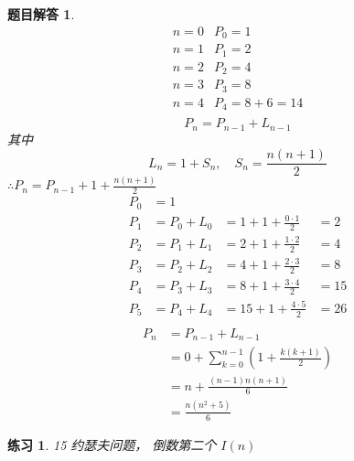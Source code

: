 \documentclass[mode=geye]{elegantnote}
\newtheorem{exercise}{练习}
\newtheorem{answer}{题目解答}
\begin{document}
\begin{answer}
	\begin{equation*}
		\begin{array}{ll}
			n=0	& P_0 = 1	\\
			n=1	& P_1 = 2	\\
			n=2 & P_2 = 4	\\
			n=3 & P_3 = 8	\\
			n=4 & P_4 = 8+6=14	\\
		\end{array}
	\end{equation*}
\begin{equation*}
	P_n = P_{n-1}+L_{n-1}
\end{equation*}
其中
\begin{equation*}
	L_n = 1+S_n,\quad S_n = \frac{n(n+1)}{2}
\end{equation*}
$ \therefore  P_n = P_{n-1}+1+\frac{n(n+1)}{2}$
\begin{equation*}
	\begin{array}{llll}
		P_0 &= 1 		& 							&		\\
		P_1 &= P_0+L_0 	&= 1+1+\frac{0\cdot 1 }{2} 	&= 2	\\ 
		P_2 &= P_1+L_1 	&= 2+1+\frac{1\cdot 2 }{2} 	&= 4	\\ 
		P_3 &= P_2+L_2 	&= 4+1+\frac{2\cdot 3 }{2} 	&= 8	\\ 
		P_4 &= P_3+L_3 	&= 8+1+\frac{3\cdot 4 }{2} 	&= 15	\\ 
		P_5 &= P_4+L_4 	&=15+1+\frac{4\cdot 5 }{2} 	&= 26	\\ 
	\end{array}
\end{equation*}
\begin{align*}
	P_n 
	&= P_{n-1}+L_{n-1} 		\\
	&= 0 + \sum_{k=0}^{n-1}\left(1+\frac{k(k+1)}{2}\right)	\\
	&= n + \frac{(n-1)n(n+1)}{6} \\
	&= \frac{n(n^2+5)}{6}
\end{align*}
\end{answer}

\begin{exercise}
	15 约瑟夫问题， 倒数第二个 $ I(n) $
\end{exercise}
\end{document}
